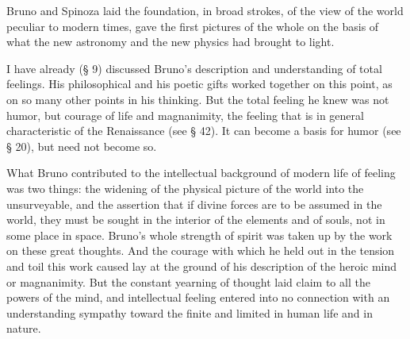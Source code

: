 \documentclass[12pt]{book}
\newcommand{\opage}[1]{\marginnote{\footnotesize\textit{[#1]}}}
\begin{document}
Bruno and Spinoza laid the foundation, in broad strokes, of the view of the world peculiar to
modern times, gave the first pictures of the whole on the basis of what the new astronomy and the
new physics had brought to light.

I have already (§ 9) discussed Bruno's description and understanding of total feelings. His
philosophical and his poetic gifts worked together on this point, as on so many other points in his
thinking. But the total feeling he knew was not humor, but courage of life and magnanimity, the
feeling that is in general \opage{155}characteristic of the Renaissance (see § 42). It can become
a basis for humor (see § 20), but need not become so.

What Bruno contributed to the intellectual background of modern life of feeling was two things: the
widening of the physical picture of the world into the unsurveyable, and the assertion that if
divine forces are to be assumed in the world, they must be sought in the interior of the elements
and of souls, not in some place in space. Bruno's whole strength of spirit was taken up by the work
on these great thoughts. And the courage with which he held out in the tension and toil this work
caused lay at the ground of his description of the heroic mind or magnanimity. But the constant
yearning of thought laid claim to all the powers of the mind, and intellectual feeling entered into
no connection with an understanding sympathy toward the finite and limited in human life and in
nature.
\end{document}
